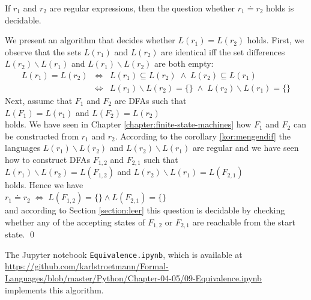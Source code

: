 \begin{Theorem}
  If $r_1$ and $r_2$ are regular expressions, then the question whether $r_1 \doteq r_2$ holds is decidable.
\end{Theorem}

\proofEng
We present an algorithm that decides whether $L(r_1) = L(r_2)$ holds.  First, we observe that the sets
$L(r_1)$ and $L(r_2)$ are identical iff the set differences $L(r_2) \backslash L(r_1)$ and $L(r_1) \backslash L(r_2)$
are both empty:
\begin{eqnarray*}
                  L(r_1) = L(r_2) 
&\Leftrightarrow& L(r_1) \subseteq L(r_2)         \;\wedge\; L(r_2) \subseteq L(r_1)          \\
&\Leftrightarrow& L(r_1) \backslash L(r_2) = \{\} \;\wedge\; L(r_2) \backslash L(r_1) = \{\}  
\end{eqnarray*}
Next, assume that $F_1$ and $F_2$ are  \textsc{DFA}s such that
\\[0.2cm]
\hspace*{1.3cm}
$L(F_1) = L(r_1)$ \quad and \quad $L(F_2) = L(r_2)$
\\[0.2cm]
holds.  We have seen in Chapter \ref{chapter:finite-state-machines} how $F_1$ and $F_2$ can be
constructed from $r_1$ and $r_2$. According to the corollary \ref{kor:mengendif} the languages
$L(r_1) \backslash L(r_2)$ and $L(r_2) \backslash L(r_1)$ are regular and we have seen how to
construct \textsc{DFA}s $F_{1,2}$ and $F_{2,1}$ such that
\\[0.2cm]
\hspace*{1.3cm}
$L(r_1) \backslash L(r_2) = L(F_{1,2})$ \quad and \quad $L(r_2) \backslash L(r_1) = L(F_{2,1})$ 
\\[0.2cm]
holds.  Hence we have
\\[0.2cm]
\hspace*{1.3cm}
$r_1 \doteq r_2 \;\Leftrightarrow\; L(F_{1,2}) = \{\} \wedge  L(F_{2,1}) = \{\}$
\\[0.2cm]
and according to Section \ref{section:leer} this question is decidable by checking whether any of
the accepting states of $F_{1,2}$ or $F_{2,1}$ are reachable from the start state.
\qed

\remarkEng
The Jupyter notebook \texttt{Equivalence.ipynb}, which is available at
\\[0.2cm]
\hspace*{-0.3cm}
\href{https://github.com/karlstroetmann/Formal-Languages/blob/master/Python/Chapter-04-05/09-Equivalence.ipynb}{https://github.com/karlstroetmann/Formal-Languages/blob/master/Python/Chapter-04-05/09-Equivalence.ipynb}
\\[0.2cm]
implements this algorithm.

